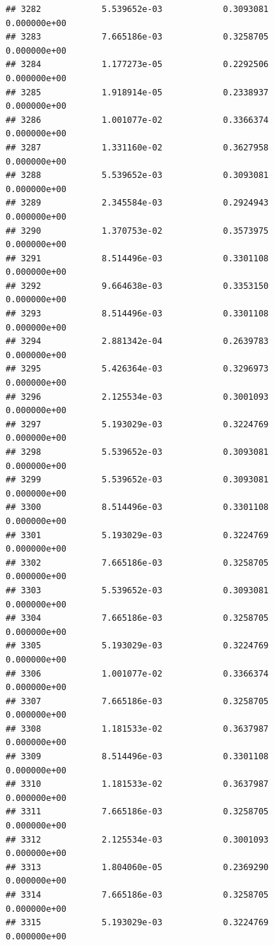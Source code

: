 \documentclass[
]{article}
\begin{document}
\begin{verbatim}
## 3282            5.539652e-03            0.3093081            0.000000e+00
## 3283            7.665186e-03            0.3258705            0.000000e+00
## 3284            1.177273e-05            0.2292506            0.000000e+00
## 3285            1.918914e-05            0.2338937            0.000000e+00
## 3286            1.001077e-02            0.3366374            0.000000e+00
## 3287            1.331160e-02            0.3627958            0.000000e+00
## 3288            5.539652e-03            0.3093081            0.000000e+00
## 3289            2.345584e-03            0.2924943            0.000000e+00
## 3290            1.370753e-02            0.3573975            0.000000e+00
## 3291            8.514496e-03            0.3301108            0.000000e+00
## 3292            9.664638e-03            0.3353150            0.000000e+00
## 3293            8.514496e-03            0.3301108            0.000000e+00
## 3294            2.881342e-04            0.2639783            0.000000e+00
## 3295            5.426364e-03            0.3296973            0.000000e+00
## 3296            2.125534e-03            0.3001093            0.000000e+00
## 3297            5.193029e-03            0.3224769            0.000000e+00
## 3298            5.539652e-03            0.3093081            0.000000e+00
## 3299            5.539652e-03            0.3093081            0.000000e+00
## 3300            8.514496e-03            0.3301108            0.000000e+00
## 3301            5.193029e-03            0.3224769            0.000000e+00
## 3302            7.665186e-03            0.3258705            0.000000e+00
## 3303            5.539652e-03            0.3093081            0.000000e+00
## 3304            7.665186e-03            0.3258705            0.000000e+00
## 3305            5.193029e-03            0.3224769            0.000000e+00
## 3306            1.001077e-02            0.3366374            0.000000e+00
## 3307            7.665186e-03            0.3258705            0.000000e+00
## 3308            1.181533e-02            0.3637987            0.000000e+00
## 3309            8.514496e-03            0.3301108            0.000000e+00
## 3310            1.181533e-02            0.3637987            0.000000e+00
## 3311            7.665186e-03            0.3258705            0.000000e+00
## 3312            2.125534e-03            0.3001093            0.000000e+00
## 3313            1.804060e-05            0.2369290            0.000000e+00
## 3314            7.665186e-03            0.3258705            0.000000e+00
## 3315            5.193029e-03            0.3224769            0.000000e+00

\end{verbatim}
\end{document}
